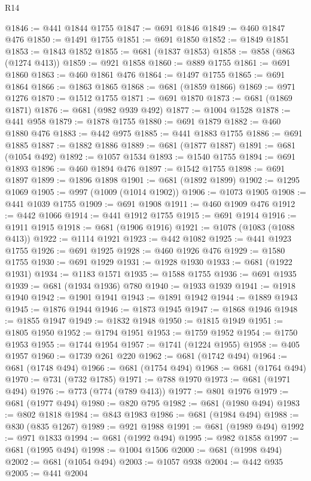 \begin{lexlean}{R14}
\begin{coremodule}
@1846 := @441 @1844 @1755
@1847 := @691 @1846
@1849 := @460 @1847 @476
@1850 := @1491 @1755
@1851 := @691 @1850
@1852 := @1849 @1851
@1853 := @1843 @1852
@1855 := @681 (@1837 @1853)
@1858 := @858 (@863 (@1274 @413))
@1859 := @921 @1858
@1860 := @889 @1755
@1861 := @691 @1860
@1863 := @460 @1861 @476
@1864 := @1497 @1755
@1865 := @691 @1864
@1866 := @1863 @1865
@1868 := @681 (@1859 @1866)
@1869 := @971 @1276
@1870 := @1512 @1755
@1871 := @691 @1870
@1873 := @681 (@1869 @1871)
@1876 := @681 (@982 @939 @492)
@1877 := @1004 @1528
@1878 := @441 @958
@1879 := @1878 @1755
@1880 := @691 @1879
@1882 := @460 @1880 @476
@1883 := @442 @975
@1885 := @441 @1883 @1755
@1886 := @691 @1885
@1887 := @1882 @1886
@1889 := @681 (@1877 @1887)
@1891 := @681 (@1054 @492)
@1892 := @1057 @1534
@1893 := @1540 @1755
@1894 := @691 @1893
@1896 := @460 @1894 @476
@1897 := @1542 @1755
@1898 := @691 @1897
@1899 := @1896 @1898
@1901 := @681 (@1892 @1899)
@1902 := @1295 @1069
@1905 := @997 (@1009 (@1014 @1902))
@1906 := @1073 @1905
@1908 := @441 @1039 @1755
@1909 := @691 @1908
@1911 := @460 @1909 @476
@1912 := @442 @1066
@1914 := @441 @1912 @1755
@1915 := @691 @1914
@1916 := @1911 @1915
@1918 := @681 (@1906 @1916)
@1921 := @1078 (@1083 (@1088 @413))
@1922 := @1114 @1921
@1923 := @442 @1082
@1925 := @441 @1923 @1755
@1926 := @691 @1925
@1928 := @460 @1926 @476
@1929 := @1580 @1755
@1930 := @691 @1929
@1931 := @1928 @1930
@1933 := @681 (@1922 @1931)
@1934 := @1183 @1571
@1935 := @1588 @1755
@1936 := @691 @1935
@1939 := @681 (@1934 @1936) @780
@1940 := @1933 @1939
@1941 := @1918 @1940
@1942 := @1901 @1941
@1943 := @1891 @1942
@1944 := @1889 @1943
@1945 := @1876 @1944
@1946 := @1873 @1945
@1947 := @1868 @1946
@1948 := @1855 @1947
@1949 := @1832 @1948
@1950 := @1815 @1949
@1951 := @1805 @1950
@1952 := @1794 @1951
@1953 := @1759 @1952
@1954 := @1750 @1953
@1955 := @1744 @1954
@1957 := @1741 (@1224 @1955)
@1958 := @405 @1957
@1960 := @1739 @261 @220
@1962 := @681 (@1742 @494)
@1964 := @681 (@1748 @494)
@1966 := @681 (@1754 @494)
@1968 := @681 (@1764 @494)
@1970 := @731 (@732 @1785)
@1971 := @788 @1970
@1973 := @681 (@1971 @494)
@1976 := @773 (@774 (@789 @413))
@1977 := @801 @1976
@1979 := @681 (@1977 @494)
@1980 := @820 @795
@1982 := @681 (@1980 @494)
@1983 := @802 @1818
@1984 := @843 @1983
@1986 := @681 (@1984 @494)
@1988 := @830 (@835 @1267)
@1989 := @921 @1988
@1991 := @681 (@1989 @494)
@1992 := @971 @1833
@1994 := @681 (@1992 @494)
@1995 := @982 @1858
@1997 := @681 (@1995 @494)
@1998 := @1004 @1506
@2000 := @681 (@1998 @494)
@2002 := @681 (@1054 @494)
@2003 := @1057 @938
@2004 := @442 @935
@2005 := @441 @2004

\end{coremodule}
\end{lexlean}
